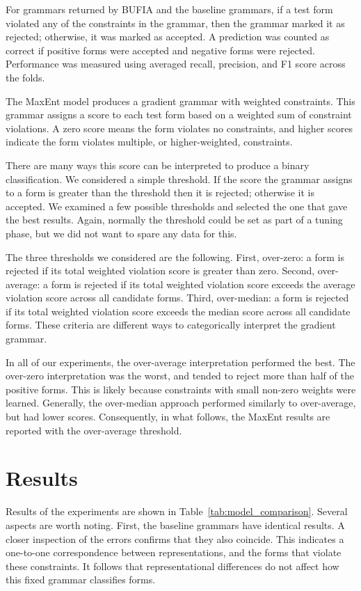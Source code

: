 For grammars returned by BUFIA and the baseline grammars,
if a test form violated any of the constraints in the grammar,
then the grammar marked it as rejected; otherwise, it was marked as accepted.
A prediction was counted as correct if positive forms were accepted
and negative forms were rejected.
Performance was measured using averaged recall, precision,
and F1 score across the folds.

The MaxEnt model produces a gradient grammar with weighted constraints.
This grammar assigns a score to each test form
based on a weighted sum of constraint violations.
A zero score means the form violates no constraints, and higher scores
indicate the form violates multiple, or higher-weighted, constraints.

There are many ways this score can be interpreted to produce a binary
classification.
We considered a simple threshold.
If the score the grammar assigns to a form is greater than the threshold then
it is rejected;
otherwise it is accepted.
We examined a few possible thresholds and selected the one that gave the best
results.
Again, normally the threshold could be set as part of a tuning phase,
but we did not want to spare any data for this.

The three thresholds we considered are the following.
First, over-zero: a form is rejected if its total weighted violation score is
greater than zero.
Second, over-average: a form is rejected if its total weighted violation score
exceeds the average violation score across all candidate forms.
Third, over-median: a form is rejected if its total weighted violation score
exceeds the median score across all candidate forms.
These criteria are different ways to categorically interpret the gradient grammar.

In all of our experiments, the over-average interpretation 
performed the best.
The over-zero interpretation was the worst, and tended to reject more than half
of the positive forms.
This is likely because constraints with small non-zero weights were learned.
Generally, the over-median approach performed similarly to over-average, but
had lower scores.
Consequently, in what follows, the MaxEnt results are reported with the
over-average threshold.

\section{Results}

Results of the experiments are shown in Table~\ref{tab:model_comparison}.
Several aspects are worth noting.
First, the baseline grammars have identical results.
A closer inspection of the errors confirms that they also coincide.
This indicates a one-to-one correspondence between representations,
and the forms that violate these constraints.
It follows that representational differences do not affect
how this fixed grammar classifies forms.

